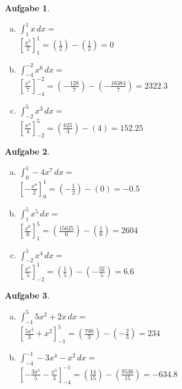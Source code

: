 \documentclass[12pt]{article}
\theoremstyle{note}
\newtheorem{aufgabe}{Aufgabe}
\begin{document}
\begin{flushleft}
\begin{aufgabe} ~ \ 
\begin{multicols}{3} 
\begin{enumerate}[a)] 
\item $\int_{1}^{1} x\, dx$$=$ \\$[\frac{x^{2}}{2}]_{\scriptscriptstyle1}^{\scriptscriptstyle1}=(\frac{1}{2})-(\frac{1}{2})=0$
\item $\int_{-4}^{-2} x^{6}\, dx$$=$ \\$[\frac{x^{7}}{7}]_{\scriptscriptstyle-4}^{\scriptscriptstyle-2}=(- \frac{128}{7})-(- \frac{16384}{7})=2322.3$
\item $\int_{-2}^{5} x^{3}\, dx$$=$ \\$[\frac{x^{4}}{4}]_{\scriptscriptstyle-2}^{\scriptscriptstyle5}=(\frac{625}{4})-(4)=152.25$
\end{enumerate} 
\end{multicols} 
\end{aufgabe}\vspace{1em}\begin{aufgabe} ~ \ 
\begin{multicols}{3} 
\begin{enumerate}[a)] 
\item $\int_{0}^{1} - 4 x^{7}\, dx$$=$ \\$[- \frac{x^{8}}{2}]_{\scriptscriptstyle0}^{\scriptscriptstyle1}=(- \frac{1}{2})-(0)=-0.5$
\item $\int_{1}^{5} x^{5}\, dx$$=$ \\$[\frac{x^{6}}{6}]_{\scriptscriptstyle1}^{\scriptscriptstyle5}=(\frac{15625}{6})-(\frac{1}{6})=2604$
\item $\int_{-2}^{1} x^{4}\, dx$$=$ \\$[\frac{x^{5}}{5}]_{\scriptscriptstyle-2}^{\scriptscriptstyle1}=(\frac{1}{5})-(- \frac{32}{5})=6.6$
\end{enumerate} 
\end{multicols} 
\end{aufgabe}\vspace{1em}\begin{aufgabe} ~ \ 
\begin{multicols}{3} 
\begin{enumerate}[a)] 
\item $\int_{-1}^{5} 5 x^{2} + 2 x\, dx$$=$ \\$[\frac{5 x^{3}}{3} + x^{2}]_{\scriptscriptstyle-1}^{\scriptscriptstyle5}=(\frac{700}{3})-(- \frac{2}{3})=234$
\item $\int_{-4}^{-1} - 3 x^{4} - x^{2}\, dx$$=$ \\$[- \frac{3 x^{5}}{5} - \frac{x^{3}}{3}]_{\scriptscriptstyle-4}^{\scriptscriptstyle-1}=(\frac{14}{15})-(\frac{9536}{15})=-634.8$

\end{enumerate}
\end{multicols}
\end{aufgabe}
\end{flushleft}
\end{document}
